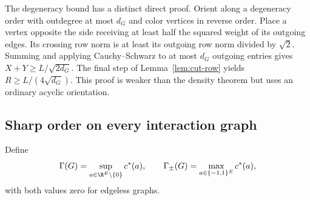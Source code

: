 The degeneracy bound has a distinct direct proof. Orient along a degeneracy
order with outdegree at most $d_G$ and color vertices in reverse order.
Place a vertex opposite the side receiving at least half the squared weight
of its outgoing edges. Its crossing row norm is at least its outgoing row
norm divided by $\sqrt2$. Summing and applying Cauchy--Schwarz to at most
$d_G$ outgoing entries gives $X+Y\ge L/\sqrt{2d_G}$. The final step of
Lemma~\ref{lem:cut-row} yields $R\ge L/(4\sqrt{d_G})$. This proof is
weaker than the density theorem but uses an ordinary acyclic orientation.

\subsection{Sharp order on every interaction graph}
Define
\[
 \Gamma(G)=\sup_{a\in\R^E\setminus\{0\}}c^*(a),\qquad
 \Gamma_\pm(G)=\max_{a\in\{-1,1\}^E}c^*(a),
\]
with both values zero for edgeless graphs.

